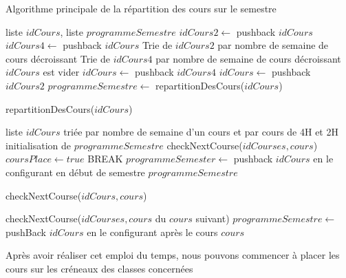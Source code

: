 \documentclass[12pt,a4paper,french]{article}
\begin{document}
\begin{algorithm}
\caption{Algorithme principale de la répartition des cours sur le semestre}
\begin{algorithmic}
\REQUIRE liste $idCours$, liste $programmeSemestre$
\STATE $idCours2 \leftarrow$ pushback $idCours$
\ELSE
\STATE $idCours4 \leftarrow$ pushback $idCours$
\ENDIF
\ENDFOR
\STATE Trie de $idCours2$ par nombre de semaine de cours décroissant
\STATE Trie de $idCours4$ par nombre de semaine de cours décroissant
\STATE $idCours$ est vider
\STATE $idCours \leftarrow$ pushback $idCours4$
\ENDFOR
{}
\STATE $idCours \leftarrow$ pushback $idCours2$
\ENDFOR
\RETURN $programmeSemestre \leftarrow$ repartitionDesCours($idCours$)
\end{algorithmic}
\end{algorithm}

\begin{algorithm}
\caption{repartitionDesCours($idCours$)}
\begin {algorithmic}
\REQUIRE liste $idCours$ triée par nombre de semaine d'un cours et par cours de 4H et 2H
\STATE initialisation de $programmeSemestre$
\STATE checkNextCourse($idCourses, cours$)
\STATE $coursPlace \leftarrow true$
\STATE BREAK
\ENDIF
\ENDIF
\ENDFOR
{}
\STATE $programmeSemester \leftarrow$ pushback $idCours$ en le configurant en début de semestre
\ENDIF
\ENDFOR
\RETURN $programmeSemestre$
\end{algorithmic}
\end{algorithm}


\newpage

\begin{algorithm}
\caption{checkNextCourse($idCours, cours$)}
\begin {algorithmic}
\STATE checkNextCourse($idCourses, cours$ du $cours$ suivant)
\STATE $programmeSemestre \leftarrow$ pushBack $idCours$ en le configurant après le cours $cours$
\ENDIF
\end{algorithmic}
\end{algorithm}

Après avoir réaliser cet emploi du temps, nous pouvons commencer à placer les cours sur les créneaux des classes concernées
\end{document}
